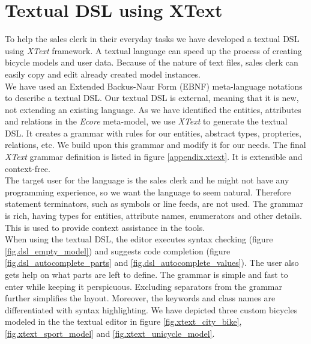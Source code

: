 \section{Textual DSL using XText}
\label{sec.xtext}
\noindent To help the sales clerk in their everyday tasks we have developed a
textual DSL using \emph{XText} framework. A textual language can speed up the process of
creating bicycle models and user data. Because of the nature of text files,
sales clerk can easily copy and edit already created model instances.\\

\noindent We have used an Extended Backus-Naur Form (EBNF)
meta-language notations to describe a textual DSL. Our textual DSL is external,
meaning that it is new, not extending an existing language. As we have
identified the entities, attributes and relations in the \emph{Ecore} meta-model, we use
\emph{XText} to generate the textual DSL. It creates a grammar with rules for
our entities, abstract types, propteries, relations, etc. We build upon this
grammar and modify it for our needs. The final \emph{XText} grammar definition
is listed in figure \ref{appendix.xtext}. It is extensible and context-free.\\

\noindent The target user for the language is the sales clerk and he might not
have any programming experience, so we want the language to seem
natural. Therefore statement terminators, such as symbols or line feeds, are not
used. The grammar is rich, having types for entities, attribute
names, enumerators and other details. This is used to provide context assistance
in the tools.\\

\noindent When using the textual DSL, the editor executes syntax checking
(figure \ref{fig.dsl_empty_model}) and suggests code completion (figure
\ref{fig.dsl_autocomplete_parts} and \ref{fig.dsl_autocomplete_values}). The
user also gets help on what parts are left to define. The grammar is simple and
fast to enter while keeping it perspicuous. Excluding separators from the
grammar further simplifies the layout. Moreover, the keywords and class names
are differentiated with syntax highlighting. We have depicted three custom
bicycles modeled in the the textual editor in figure \ref{fig.xtext_city_bike},
\ref{fig.xtext_sport_model} and \ref{fig.xtext_unicycle_model}.